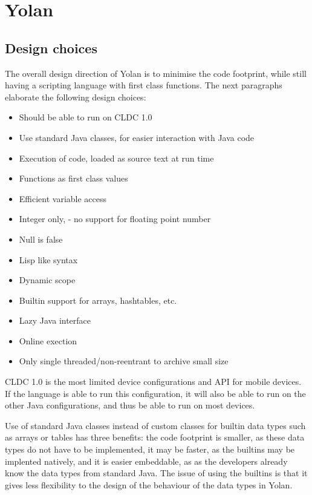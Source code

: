 \documentclass[11pt]{report}
\begin{document}
\chapter{Yolan}
\label{yolan}
\section{Design choices}
The overall design direction of Yolan is to minimise the code footprint, while still having a scripting language with first class functions.
The next paragraphs elaborate the following design choices:
\begin{itemize}
\item Should be able to run on CLDC 1.0
\item Use standard Java classes, for easier interaction with Java code
\item Execution of code, loaded as source text at run time
\item Functions as first class values
\item Efficient variable access
\item Integer only, - no support for floating point number
\item Null is false
\item Lisp like syntax
\item Dynamic scope
\item Builtin support for arrays, hashtables, etc.
\item Lazy Java interface
\item Online exection
\item Only single threaded/non-reentrant to archive small size
\end{itemize}

CLDC 1.0 is the most limited device configurations and API for mobile devices. If the language is able to run this configuration, it will also be able to run on the other Java configurations, and thus be able to run on most devices.

\label{yolandesign}
Use of standard Java classes instead of custom classes for builtin data types such as arrays or tables has three benefits: the code footprint is smaller, as these data types do not have to be implemented, it may be faster, as the builtins may be implented natively, and it is easier embeddable, as as the developers already know the data types from standard Java.
The issue of using the builtins is that it gives less flexibility to the design of the behaviour of the data types in Yolan.
\end{document}
